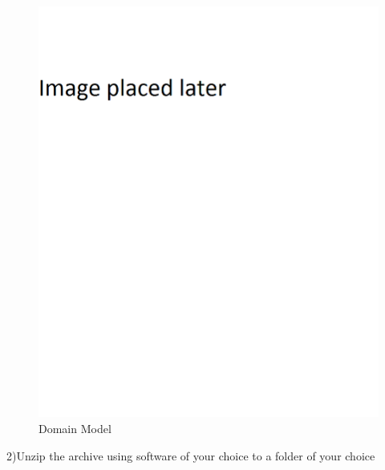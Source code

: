 	\begin{figure}[!ht]
		\centering
		\includegraphics[scale=0.5, width=15cm, keepaspectratio]{./Images/default.png}
		\caption{Domain Model}
		\label{Downloading the files}
	\end{figure}
	
2)Unzip the archive using software of your choice to a folder of your choice

